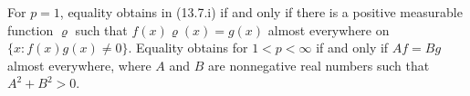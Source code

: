 For $p = 1$, equality obtains in (13.7.i) if and only if there is a positive measurable function $\varrho$ such that $f(x)\varrho(x) = g(x)$ almost everywhere on $\{x : f(x)g(x) \neq 0\}$. Equality obtains for $1 < p < \infty$ if and only if $Af = Bg$ almost everywhere, where $A$ and $B$ are nonnegative real numbers such that $A^2 + B^2 > 0$.
